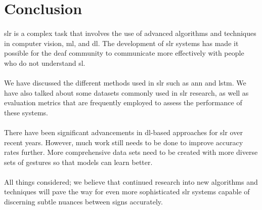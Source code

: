 \section{Conclusion}
\paragraph{}
\ac{slr} is a complex task that involves the use of advanced algorithms and techniques in computer vision, \ac{ml}, and \ac{dl}. The development of \ac{slr} systems has made it possible for the deaf community to communicate more effectively with people who do not understand \ac{sl}.
\paragraph{}
We have discussed the different methods used in \ac{slr} such as \ac{ann} and \ac{lstm}. We have also talked about some datasets commonly used in \ac{slr} research, as well as evaluation metrics that are frequently employed to assess the performance of these systems.
\paragraph{}
There have been significant advancements in \ac{dl}-based approaches for \ac{slr} over recent years. However, much work still needs to be done to improve accuracy rates further. More comprehensive data sets need to be created with more diverse sets of gestures so that models can learn better.
\paragraph{}
All things considered; we believe that continued research into new algorithms and techniques will pave the way for even more sophisticated \ac{slr} systems capable of discerning subtle nuances between signs accurately.
